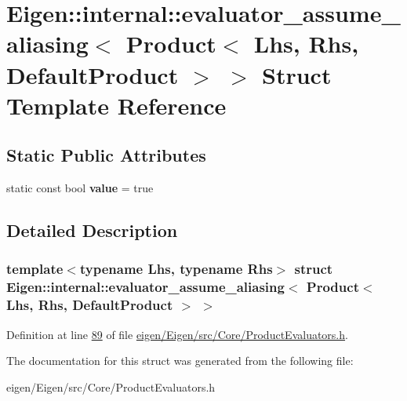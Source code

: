 \hypertarget{struct_eigen_1_1internal_1_1evaluator__assume__aliasing_3_01_product_3_01_lhs_00_01_rhs_00_01_default_product_01_4_01_4}{}\section{Eigen\+:\+:internal\+:\+:evaluator\+\_\+assume\+\_\+aliasing$<$ Product$<$ Lhs, Rhs, Default\+Product $>$ $>$ Struct Template Reference}
\label{struct_eigen_1_1internal_1_1evaluator__assume__aliasing_3_01_product_3_01_lhs_00_01_rhs_00_01_default_product_01_4_01_4}
\subsection*{Static Public Attributes}
\begin{DoxyCompactItemize}
\item 
\mbox{\label{struct_eigen_1_1internal_1_1evaluator__assume__aliasing_3_01_product_3_01_lhs_00_01_rhs_00_01_default_product_01_4_01_4_ab9b1d055e9babaeac22bb90f7b4a38f1}} 
static const bool {\bfseries value} = true
\end{DoxyCompactItemize}


\subsection{Detailed Description}
\subsubsection*{template$<$typename Lhs, typename Rhs$>$\newline
struct Eigen\+::internal\+::evaluator\+\_\+assume\+\_\+aliasing$<$ Product$<$ Lhs, Rhs, Default\+Product $>$ $>$}



Definition at line \hyperlink{eigen_2_eigen_2src_2_core_2_product_evaluators_8h_source_l00089}{89} of file \hyperlink{eigen_2_eigen_2src_2_core_2_product_evaluators_8h_source}{eigen/\+Eigen/src/\+Core/\+Product\+Evaluators.\+h}.



The documentation for this struct was generated from the following file\+:\begin{DoxyCompactItemize}
\item 
eigen/\+Eigen/src/\+Core/\+Product\+Evaluators.\+h\end{DoxyCompactItemize}

